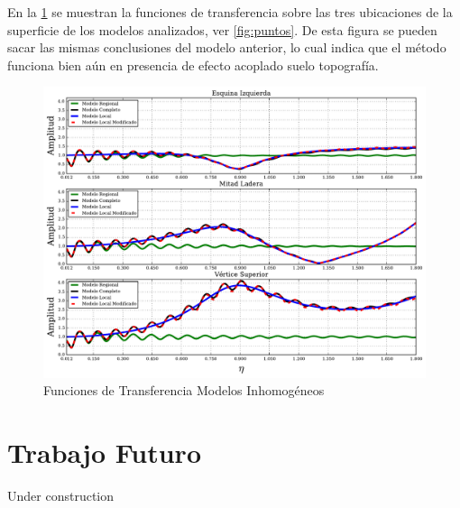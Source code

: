 \documentclass[spanish,letterpaper,12pt,twoside,openany]{article}
\begin{document}
En la \cref{fig:tfinhom} se muestran la funciones de transferencia sobre las tres ubicaciones de la superficie de los modelos analizados, ver \cref{fig:puntos}. De esta figura se pueden sacar las mismas conclusiones del modelo anterior, lo cual indica que el método funciona bien aún en presencia de efecto acoplado suelo topografía.

\begin{figure}[H]
	\centering
	\includegraphics[width=15 cm]{img/TransFuncInHom.pdf}
	\vspace{-.5 cm}
	\caption{Funciones de Transferencia Modelos Inhomogéneos}
	\label{fig:tfinhom}
	\vspace{-1 cm}
\end{figure}
%
%
%
%
%
\newpage
%
\section{Trabajo Futuro}
%
Under construction
%


\end{document}
